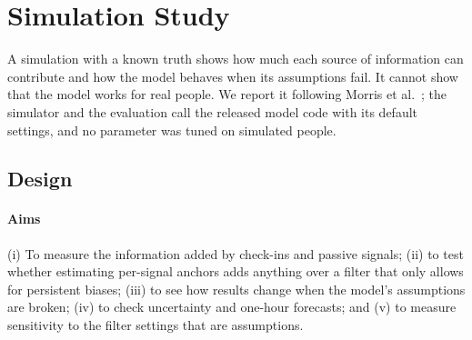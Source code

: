 \section{Simulation Study}
\label{sec:simulation}

A simulation with a known truth shows how much each source of information can contribute and how the model behaves when its assumptions fail. It cannot show that the model works for real people. We report it following Morris et al.~\cite{morris2019using}; the simulator and the evaluation call the released model code with its default settings, and no parameter was tuned on simulated people.

\subsection{Design}
\paragraph*{Aims} (i) To measure the information added by check-ins and passive signals; (ii) to test whether estimating per-signal anchors adds anything over a filter that only allows for persistent biases; (iii) to see how results change when the model's assumptions are broken; (iv) to check uncertainty and one-hour forecasts; and (v) to measure sensitivity to the filter settings that are assumptions.

